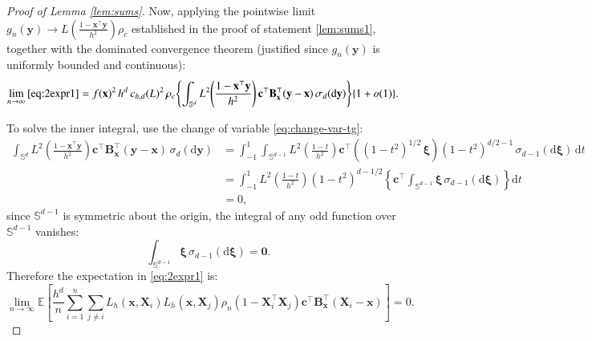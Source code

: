 \documentclass[12pt]{report} %
\newcommand{\bX}{\mathbf{X}}
\newcommand{\bx}{\mathbf{x}}
\newcommand{\by}{\mathbf{y}}
\newcommand{\bc}{\mathbf{c}}
\newcommand{\bxi}{\boldsymbol{\xi}}
\newcommand{\sigmad}{\sigma_{d}}
\newcommand{\sigmadm}{\sigma_{d-1}}
\newcommand{\rd}{\mathrm{d}}
\newcommand{\Sd}{\mathbb{S}^{d}}
\newcommand{\Sdm}{\mathbb{S}^{d-1}}
\newcommand{\bB}{\mathbf{B}}
\begin{document}
\begin{proof}[Proof of Lemma \ref{lem:sums}]
Now, applying the pointwise limit $g_n(\by) \to 
L\!\left(\frac{1-\bx^\top\by}{h^2}\right)\rho_c$ established in the proof of statement \ref{lem:sums1}, together with the dominated convergence theorem (justified since $g_n(\by)$ is uniformly bounded and continuous):
\begin{align}
\lim_{n\to\infty}\eqref{eq:2expr1}
&= f(\bx)^2\, h^d\, c_{h,d}(L)^2\,\rho_c
\Biggl\{
\int_{\Sd}
L^2\!\left(\frac{1-\bx^\top\by}{h^2}\right)
\bc^\top\bB_{\bx}^\top(\by-\bx)
\,\sigmad(\rd\by)
\Biggr\}\{1+o(1)\}.
\label{eq:2expr3}
\end{align}

To solve the inner integral, use the change of variable \eqref{eq:change-var-tg}:
\begin{align*}
\int_{\Sd} 
L^2\!\left(\frac{1-\bx^\top\by}{h^2}\right)
\bc^\top\bB_{\bx}^\top\left(\by-\bx\right)
\,\sigmad(\rd\by)
&= \int_{-1}^{1}\int_{\Sdm}
L^2\!\left(\frac{1-t}{h^2}\right)
\bc^\top\left((1-t^2)^{1/2}\,\bxi\right)
(1-t^2)^{d/2-1}
\,\sigmadm(\rd\bxi)\,\rd t \\
&= \int_{-1}^{1}
L^2\!\left(\frac{1-t}{h^2}\right)
(1-t^2)^{d-1/2}
\left\{\bc^\top\int_{\Sdm}\bxi\,\sigmadm(\rd\bxi)\right\}
\rd t \\
&= 0,
\end{align*}
since $\Sdm$ is symmetric about the origin, the integral 
of any odd function over $\Sdm$ vanishes:
\begin{equation*}
    \int_{\Sdm} \bxi\,\sigmadm(\rd\bxi) = \mathbf{0}.
\end{equation*}
Therefore the expectation in \eqref{eq:2expr1} is:
\begin{equation*}
\lim_{n \to \infty}\mathbb{E}\!\left[
\frac{h^d}{n} \sum_{i=1}^n\sum_{j\neq i} 
L_h\left(\bx, \bX_i\right)L_h\left(\bx, \bX_j\right)
\rho_n\left(1-\bX_i^\top\bX_j\right)
\bc^\top\bB_{\bx}^\top\left(\bX_i -\bx\right)
\right] = 0.
\end{equation*}


\end{proof}
\end{document}
